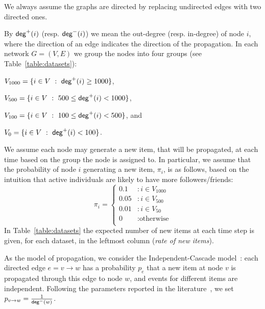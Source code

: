 We always assume the graphs are directed by replacing undirected edges with two directed ones.

By $\mathsf{deg}^+(i)$ (resp. $\mathsf{deg}^-(i)$) we mean the out-degree (resp.
in-degree) of node $i$, where the direction of an edge indicates the direction
of the propagation. In each network $G=(V,E)$ we group the nodes into four
groups (see Table~\ref{table:datasets}):
\begin{itemize*}
 \item $V_{1000} = \{i\in V ~:~ \mathsf{deg}^+(i) \geq 1000\}$,
 \item $V_{500}  = \{i\in V ~:~ 500\leq \mathsf{deg}^+(i) < 1000\}$,
 \item $V_{100}  = \{i\in V ~:~ 100\leq \mathsf{deg}^+(i) < 500\}$, and
 \item $V_{0}    = \{i\in V ~:~ \mathsf{deg}^+(i) < 100\}$.
\end{itemize*}
We assume each node may generate a new item, that will be propagated, at each
time based on the group the node is assigned to. In particular, we assume that
the probability of  node $i$ generating a new item, $\pi_i$, is as follows,
based on the intuition that active individuals are  likely to have more
followers/friends:
$$
   \pi_i = \left\{
     \begin{array}{ll}
       0.1 &: i \in V_{1000}\\
       0.05 &: i \in V_{500} \\
       0.01 &: i \in V_{50} \\
       0 & : \text{otherwise} \\
     \end{array}
   \right.
$$
 In Table~\ref{table:datasets} the expected number of new items at each time
 step is given, for each dataset, in the leftmost column (\emph{rate of new
 items}).

As the model of propagation, we consider the Independent-Cascade
model~\cite{Kempe2003}:  each directed edge $e=v\rightarrow w$ has a probability
$p_e$ that a new item at node $v$ is propagated through this edge to node $w$,
and events for different items are independent. Following the parameters
reported in the
literature~\cite{Kempe2003,Chen2009,Chen2010,jung2011irie,tang2014influence}, we
set $p_{v\rightarrow w} = \frac{1}{\mathsf{deg}^-(w)}$.


